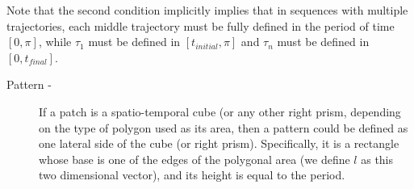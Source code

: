 \documentclass[conference]{acmsiggraph}
\newcommand\note[1]{{\color{Red}#1}}
\begin{document}
Note that the second condition implicitly implies that in sequences with multiple trajectories, each middle trajectory must be fully defined in the period of time $[0,\pi]$, while $\tau_1$ must be defined in $[t_{initial},\pi]$ and $\tau_n$ must be defined in $[0, t_{final}]$.

\begin{description}

\item[Pattern -]{If a patch is a spatio-temporal cube (or any other right prism, depending on the type of polygon used as its area}, then a pattern could be defined as one lateral side of the \note{cube (or right prism). Specifically, it is a rectangle whose base is one of the edges of the polygonal area (we define $l$ as this two dimensional vector), and its height is equal to the period. }

\end{description}














\end{document}
